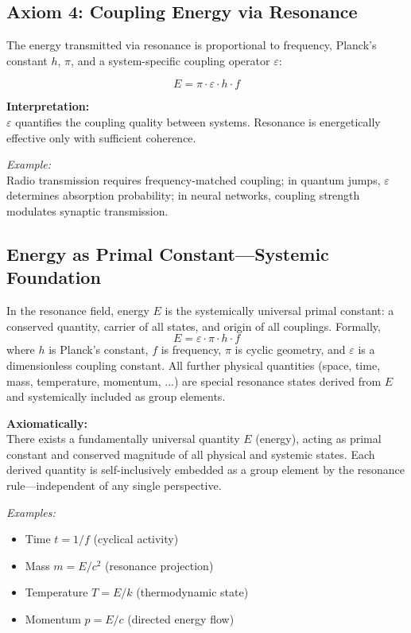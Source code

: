 \documentclass[12pt]{iopart}
\begin{document}
\subsection{Axiom 4: Coupling Energy via Resonance}

The energy transmitted via resonance is proportional to frequency, Planck’s constant $h$, $\pi$, and a system-specific coupling operator $\varepsilon$:

$$
E = \pi \cdot \varepsilon \cdot h \cdot f
$$

\textbf{Interpretation:}\\
$\varepsilon$ quantifies the coupling quality between systems. Resonance is energetically effective only with sufficient coherence.

\textit{Example:}\\
Radio transmission requires frequency-matched coupling; in quantum jumps, $\varepsilon$ determines absorption probability; in neural networks, coupling strength modulates synaptic transmission.

\subsection{Energy as Primal Constant—Systemic Foundation}

In the resonance field, energy $E$ is the systemically universal primal constant: a conserved quantity, carrier of all states, and origin of all couplings. Formally,
\[
E = \varepsilon \cdot \pi \cdot h \cdot f
\]
where $h$ is Planck’s constant, $f$ is frequency, $\pi$ is cyclic geometry, and $\varepsilon$ is a dimensionless coupling constant. All further physical quantities (space, time, mass, temperature, momentum, ...) are special resonance states derived from $E$ and systemically included as group elements.

\textbf{Axiomatically:}\\
There exists a fundamentally universal quantity $E$ (energy), acting as primal constant and conserved magnitude of all physical and systemic states.  
Each derived quantity is self-inclusively embedded as a group element by the resonance rule—independent of any single perspective.

\textit{Examples:}
\begin{itemize}
	\item Time $t = 1 / f$ (cyclical activity)
	\item Mass $m = E / c^2$ (resonance projection)
	\item Temperature $T = E / k$ (thermodynamic state)
	\item Momentum $p = E / c$ (directed energy flow)
\end{itemize}
\end{document}
